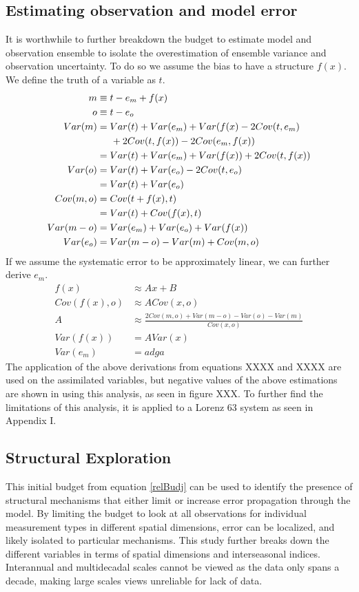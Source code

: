 \documentclass[smallextended]{svjour3}       %
\begin{document}
\subsection{Estimating observation and model error}
It is worthwhile to further breakdown the budget to estimate model and observation ensemble to isolate the overestimation of ensemble variance and observation uncertainty. To do so we assume the bias to have a structure $f(x)$. We define the truth of a variable as $t$.
\begin{align}
    m &\equiv t - e_m +f(x)\nonumber\\
    o &\equiv t - e_o\nonumber\\
    Var(m) &= Var(t) + Var(e_m) + Var(f(x) - 2Cov(t, e_m)\nonumber\\
    &\hspace{5mm}+ 2Cov(t, f(x)) -2Cov(e_m, f(x))\nonumber\\
    &= Var(t) + Var(e_m) + Var(f(x)) + 2Cov(t, f(x))\\
    Var(o) &= Var(t) + Var(e_o) - 2Cov(t, e_o)\nonumber\\
    &= Var(t) + Var(e_o)\nonumber\\
    Cov(m, o) &= Cov(t +f(x), t)\nonumber\\
    &= Var(t) + Cov(f(x), t)\nonumber\\
    Var(m-o) &= Var(e_m) + Var(e_o)+ Var(f(x)) \nonumber\\
    Var(e_o) &= Var(m-o) - Var(m) + Cov(m,o)\label{eoDeriv}
\end{align}
If we assume the systematic error to be approximately linear, we can further derive $e_m$.
\begin{align}
    f(x) &\approx Ax + B\nonumber\\
    Cov(f(x), o) &\approx ACov(x,o)\nonumber\\
    A &\approx \frac{2Cov(m,o) + Var(m-o) -Var(o) -Var(m)}{Cov(x,o)}\\
    Var(f(x)) &= A Var(x)\nonumber\\
    Var(e_m) &= adga
\end{align}
The application of the above derivations from equations XXXX and XXXX are used on the assimilated variables, but negative values of the above estimations are shown in using this analysis, as seen in figure XXX. To further find the limitations of this analysis, it is applied to a Lorenz 63 system as seen in Appendix I.
\subsection{Structural Exploration}
This initial budget from equation \ref{relBudj} can be used to identify the presence of structural mechanisms that either limit or increase error propagation through the model. By limiting the budget to look at all observations for individual measurement types in different spatial dimensions, error can be localized, and likely isolated to particular mechanisms. This study further breaks down the different variables in terms of spatial dimensions and interseasonal indices. Interannual and multidecadal scales cannot be viewed as the data only spans a decade, making large scales views unreliable for lack of data.
\end{document}
